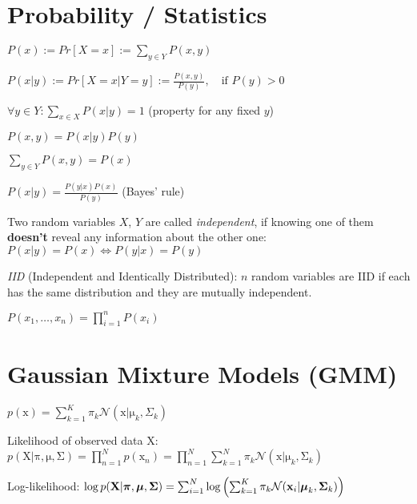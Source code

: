 \documentclass[a4paper, 11pt, landscape]{article}
\newcommand{\matr}[1]{\boldsymbol{\mathrm{#1}}}
\begin{document}
\begin{multicols*}{3}
\section{Probability / Statistics}
\begin{compactitem}
	\item $P(x) := Pr[X = x] := \sum_{y \in Y} P(x, y)$
	\item $P(x|y) := Pr[X = x | Y = y] := \frac{P(x,y)}{P(y)},\quad \text{if } P(y) > 0$
	\item $\forall y \in Y: \sum_{x \in X} P(x|y) = 1$ (property for any fixed $y$)
	\item $P(x, y) = P(x|y) P(y)$
	\item $\sum_{y \in Y} P(x, y) = P(x)$
	\item $P(x|y) = \frac{P(y|x)P(x)}{P(y)}$ (Bayes' rule)
	\item Two random variables $X$, $Y$ are called \emph{independent}, if knowing one of them \textbf{doesn't} reveal any information about the other one: $P(x|y) = P(x) \Leftrightarrow P(y|x) = P(y)$
	\item \emph{IID} (Independent and Identically Distributed): $n$ random variables are IID if each has the same distribution and they are mutually independent.
	\begin{compactitem}
		\item $P(x_1, \ldots, x_n) = \prod_{i=1}^n P(x_i)$
	\end{compactitem}
\end{compactitem}

\section{Gaussian Mixture Models (GMM)}
\begin{compactdesc}
	\item[] $p(\matr{x}) = \sum_{k=1}^K \pi_k \mathcal{N}(\matr{x} | \matr{\mu}_k, \Sigma_k)$
	\item[Likelihood of observed data $\matr{X}$:] $p(\matr{X} | \matr{\pi}, \matr{\mu}, \matr{\Sigma}) = \prod_{n=1}^N p(\matr{x}_n) = \prod_{n=1}^N \sum_{k=1}^N \pi_k \mathcal{N}(\matr{x} | \matr{\mu}_k, \matr{\Sigma}_k)$
	\item[Log-likelihood:] $\log p(\matr{X} | \matr{\pi}, \matr{\mu}, \matr{\Sigma}) =\break \sum_{i=1}^N \log \left( \sum_{k=1}^K \pi_k \mathcal{N}(\matr{x}_i | \matr{\mu}_k, \matr{\Sigma}_k) \right)$
\end{compactdesc}


\end{multicols*}
\end{document}
